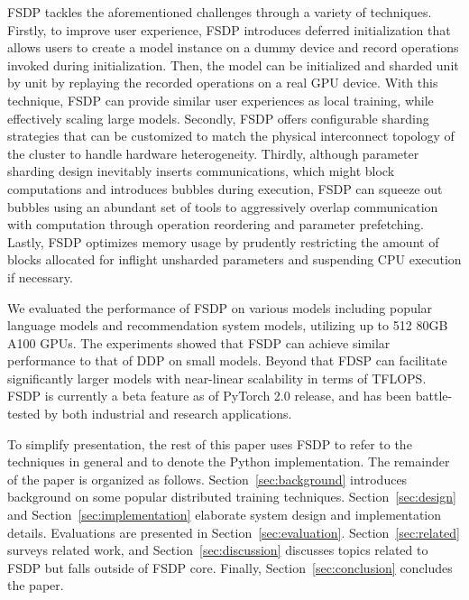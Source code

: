 FSDP tackles the aforementioned challenges through a variety of techniques. Firstly, to improve user experience, FSDP introduces deferred initialization that allows users to create a model instance on a dummy device and record operations invoked during initialization. Then, the model can be initialized and sharded unit by unit by replaying the recorded operations on a real GPU device. With this technique, FSDP can provide similar user experiences as local training, while effectively scaling large models. Secondly, FSDP offers configurable sharding strategies that can be customized to match the physical interconnect topology of the cluster to handle hardware heterogeneity. Thirdly, although parameter sharding design inevitably inserts communications, which might block computations and introduces bubbles during execution, FSDP can squeeze out bubbles using an abundant set of tools to aggressively overlap communication with computation through operation reordering and parameter prefetching. Lastly, FSDP optimizes memory usage by prudently restricting the amount of blocks allocated for inflight unsharded parameters and suspending CPU execution if necessary.

We evaluated the performance of FSDP on various models including popular language models and recommendation system models, utilizing up to 512 80GB A100 GPUs. The experiments showed that FSDP can achieve similar performance to that of DDP on small models. Beyond that FDSP can facilitate significantly larger models with near-linear scalability in terms of TFLOPS. FSDP is currently a beta feature as of PyTorch 2.0 release, and has been battle-tested by both industrial and research applications. 

To simplify presentation, the rest of this paper uses FSDP to refer to the techniques in general and  to denote the Python implementation. The remainder of the paper is organized as follows. Section~\ref{sec:background} introduces background on some popular distributed training techniques. Section~\ref{sec:design} and Section~\ref{sec:implementation} elaborate system design and implementation details. Evaluations are presented in Section~\ref{sec:evaluation}. Section~\ref{sec:related} surveys related work, and Section~\ref{sec:discussion} discusses topics related to FSDP but falls outside of FSDP core. Finally, Section~\ref{sec:conclusion} concludes the paper. 




